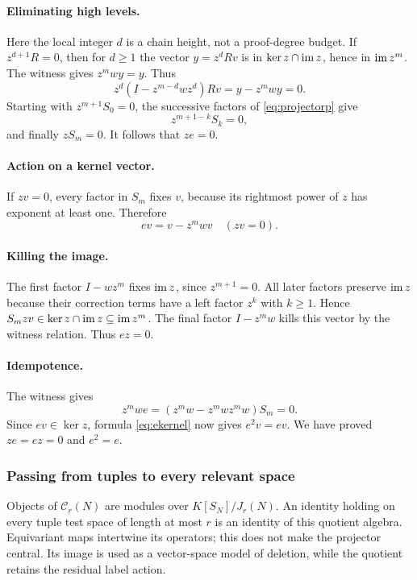 \documentclass[11pt,a4paper]{article}
\theoremstyle{definition}\newtheorem{definition}[theorem]{Definition}
\theoremstyle{remark}\newtheorem{remark}[theorem]{Remark}
\begin{document}
\paragraph{Eliminating high levels.}
Here the local integer $d$ is a chain height, not a proof-degree budget.
If $z^{d+1}R=0$, then for $d\ge1$ the vector $y=z^dRv$ is in $\ker z\cap\operatorname{im} z$, hence in $\operatorname{im} z^m$. The witness gives $z^mwy=y$. Thus
\[z^d(I-z^{m-d}wz^d)Rv=y-z^mwy=0.
\]
Starting with $z^{m+1}S_0=0$, the successive factors of \eqref{eq:projectorp} give
\[z^{m+1-k}S_k=0,
\]
and finally $zS_m=0$. It follows that $ze=0$.

\paragraph{Action on a kernel vector.}
If $zv=0$, every factor in $S_m$ fixes $v$, because its rightmost power of $z$ has exponent at least one. Therefore
\begin{equation}\label{eq:ekernel}ev=v-z^mwv\quad(zv=0).
\end{equation}

\paragraph{Killing the image.}
The first factor $I-wz^m$ fixes $\operatorname{im} z$, since $z^{m+1}=0$. All later factors preserve $\operatorname{im} z$ because their correction terms have a left factor $z^k$ with $k\ge1$. Hence $S_mzv\in\ker z\cap\operatorname{im} z\subseteq\operatorname{im} z^m$. The final factor $I-z^mw$ kills this vector by the witness relation. Thus $ez=0$.

\paragraph{Idempotence.}
The witness gives
\[z^mwe=(z^mw-z^mwz^mw)S_m=0.
\]
Since $ev\in\ker z$, formula \eqref{eq:ekernel} now gives $e^2v=ev$. We have proved $ze=ez=0$ and $e^2=e$.

\subsubsection{Passing from tuples to every relevant space}
Objects of $\mathcal C_r(N)$ are modules over $K[S_N]/J_r(N)$.
An identity holding on every tuple test space of length at most $r$ is an identity
of this quotient algebra. Equivariant maps intertwine its operators;
this does not make the projector central. Its image is used as a
vector-space model of deletion, while the quotient retains the residual
label action.
\end{document}
